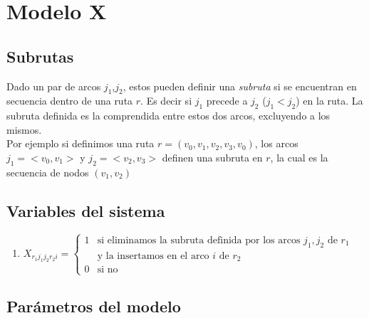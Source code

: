 \documentclass{article}
\begin{document}
\section {Modelo X}

\subsection{Subrutas}

Dado un par de arcos $j_1$,$j_2$, estos pueden definir una \textit{subruta} si se encuentran en secuencia dentro de una ruta $r$. Es decir si $j_1$ precede a $j_2$ ($j_1 < j_2$) en la ruta. La subruta definida es la comprendida entre estos dos arcos, excluyendo a los mismos.\\
Por ejemplo si definimos una ruta $r= (v_0, v_1, v_2, v_3, v_0)$, los arcos $j_1 = <v_0,v_1>$ y $j_2 = <v_2,v_3>$ definen una subruta en $r$, la cual es la secuencia de nodos $(v_1,v_2)$

\subsection {Variables del sistema}

\begin{enumerate}
\item
$
 X_{r_1 j_1 j_2 r_2 i}= 
\begin{cases}  
    1 & \text{si eliminamos la subruta definida por los arcos $j_1,j_2$ de $r_1$} \\
       & \text{y la insertamos en el arco $i$ de $r_2$}\\
    0 & \text{si no } 
\end{cases}
$
\end{enumerate}

\subsection {Parámetros del modelo}
\end{document}
